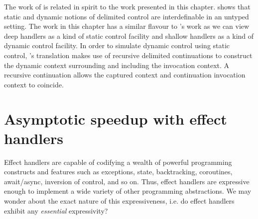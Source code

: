 \documentclass[12pt,phd,lfcs,twoside,openright,logo,leftchapter,normalheadings]{infthesis}
\theoremstyle{plain}
\theoremstyle{definition}
\begin{document}
The work of \citet{Shan04,Shan07} is related in spirit to the work
presented in this chapter. \citeauthor{Shan04} shows that static and
dynamic notions of delimited control are interdefinable in an untyped
setting. The work in this chapter has a similar flavour to
\citeauthor{Shan04}'s work as we can view deep handlers as a kind of
static control facility and shallow handlers as a kind of dynamic
control facility. In order to simulate dynamic control using static
control, \citeauthor{Shan04}'s translation makes use of recursive
delimited continuations to construct the dynamic context surrounding
and including the invocation context. A recursive continuation allows
the captured context and continuation invocation context to coincide.


\chapter{Asymptotic speedup with effect handlers}
\label{ch:handlers-efficiency}
\def\LLL{{\mathcal L}}
\def\N{{\mathbb N}}
%

Effect handlers are capable of codifying a wealth of powerful
programming constructs and features such as exceptions, state,
backtracking, coroutines, await/async, inversion of control, and so
on.
%
Thus, effect handlers are expressive enough to implement a wide
variety of other programming abstractions.
%
We may wonder about the exact nature of this expressiveness, i.e. do
effect handlers exhibit any \emph{essential} expressivity?

\end{document}
